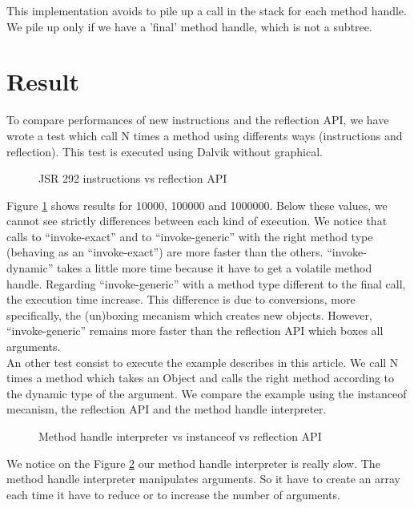 \documentclass{sig-alternate}
\def \DALVIK{Dalvik\xspace}
\begin{document}
        
    
        This implementation avoids to pile up a call in the stack for each method handle.
        We pile up only if we have a 'final' method handle, which is not a subtree.

\section{Result}

  To compare performances of new instructions and the reflection API,
  we have wrote a test which call N times a method using differents ways (instructions and reflection).
  This test is executed using \DALVIK without graphical.

  \begin{figure}[!h]
    \resizebox{\linewidth}{!}{}
    \caption{JSR 292 instructions vs reflection API}
    \label{Rinvoke}
  \end{figure}

  Figure \ref{Rinvoke} shows results for 10000, 100000 and 1000000.
  Below these values, we cannot see strictly differences between each kind of execution.
  We notice that calls to ``invoke-exact'' and to ``invoke-generic'' with the right method type (behaving as an ``invoke-exact'') are more faster than the others.
  ``invoke-dynamic'' takes a little more time because it have to get a volatile method handle.
  Regarding ``invoke-generic'' with a method type different to the final call, the execution time increase.
  This difference is due to conversions, more specifically, the (un)boxing mecanism which creates new objects.
  However, ``invoke-generic'' remains more faster than the reflection API which boxes all arguments.\\
  
  An other test consist to execute the example describes in this article.
  We call N times a method which takes an Object and calls the right method according to the dynamic type of the argument.
  We compare the example using the instanceof mecanism, the reflection API and the method handle interpreter.

  \begin{figure}[!h]
    \resizebox{\linewidth}{!}{}
    \caption{Method handle interpreter vs instanceof vs reflection API}
    \label{Rmutable}
  \end{figure}

  We notice on the Figure \ref{Rmutable} our method handle interpreter is really slow.
  The method handle interpreter manipulates arguments.
  So it have to create an array each time it have to reduce or to increase the number of arguments.
\end{document}
